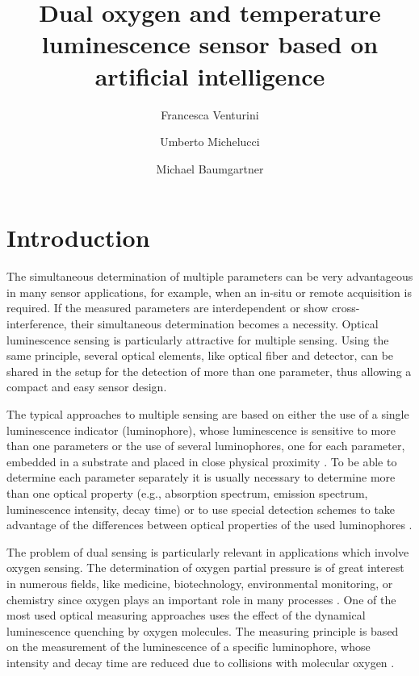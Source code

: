 \documentclass[9pt,twocolumn,twoside,pdftex]{optica}
\title{Dual oxygen and temperature luminescence sensor based on artificial intelligence}
\author[1,2,*]{Francesca Venturini}
\author[2]{Umberto Michelucci}
\author[1]{Michael Baumgartner}
\affil[1]{Institute of Applied Mathematics and Physics, Zurich University of Applied Sciences,
Technikumstrasse 9, 8401 Winterthur, Switzerland}
\affil[2]{TOELT LLC; Birchlenstr. 25, 8600 Dübendorf, Switzerland}
\affil[*]{Corresponding author: francesca.venturini@zhaw.ch}
\begin{document}
\maketitle

\section{Introduction}

The simultaneous determination of multiple parameters can be very advantageous in many sensor applications, for example, when an in-situ or remote acquisition is required. If the measured parameters are interdependent or show cross-interference, their simultaneous determination becomes a necessity. Optical luminescence sensing is particularly attractive for multiple sensing. Using the same principle, several optical elements, like optical fiber and detector, can be shared in the setup for the detection of more than one parameter, thus allowing a compact and easy sensor design.

The typical approaches to multiple sensing are based on either the use of a single luminescence indicator (luminophore), whose luminescence is sensitive to more than one parameters or the use of several luminophores, one for each parameter, embedded in a substrate and placed in close physical proximity \cite{Stich2010,Borisov2011novel,Kameya2014,Wang2014,Santoro2016,Biring2019}. To be able to determine each parameter separately it is usually necessary to determine more than one optical property (e.g., absorption spectrum, emission spectrum, luminescence intensity, decay time) or to use special detection schemes to take advantage of the differences between optical properties of the used luminophores \cite{Collier2013,Wang2014,Stehning2004,Jorge2008,Biring2019,Moore2006}. 

The problem of dual sensing is particularly relevant in applications which involve oxygen sensing. The determination of oxygen partial pressure is of great interest in numerous fields, like medicine, biotechnology, environmental monitoring, or chemistry since oxygen plays an important role in many processes \cite{Papkovsky2013,Wang2014}. One of the most used optical measuring approaches uses the effect of the dynamical luminescence quenching by oxygen molecules. The measuring principle is based on the measurement of the luminescence of a specific luminophore, whose intensity and decay time are reduced due to collisions with molecular oxygen \cite{Lakowicz2006}.
\end{document}
